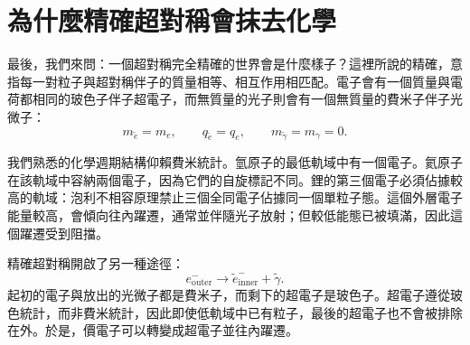 \begin{classroomqa}
\end{classroomqa}

\begin{classroomqa}
\end{classroomqa}

\begin{classroomqa}
\end{classroomqa}

\section{為什麼精確超對稱會抹去化學}

最後，我們來問：一個超對稱完全精確的世界會是什麼樣子？這裡所說的精確，意指每一對粒子與超對稱伴子的質量相等、相互作用相匹配。電子會有一個質量與電荷都相同的玻色子伴子超電子，而無質量的光子則會有一個無質量的費米子伴子光微子：
\begin{equation}
m_{\widetilde e}=m_e,
\qquad
q_{\widetilde e}=q_e,
\qquad
m_{\widetilde\gamma}=m_\gamma=0.
\end{equation}

我們熟悉的化學週期結構仰賴費米統計。氫原子的最低軌域中有一個電子。氦原子在該軌域中容納兩個電子，因為它們的自旋標記不同。鋰的第三個電子必須佔據較高的軌域：泡利不相容原理禁止三個全同電子佔據同一個單粒子態。這個外層電子能量較高，會傾向往內躍遷，通常並伴隨光子放射；但較低能態已被填滿，因此這個躍遷受到阻擋。

精確超對稱開啟了另一種途徑：
\begin{equation}
e^-_{\mathrm{outer}}
\longrightarrow
\widetilde e^-_{\mathrm{inner}}
+
\widetilde\gamma .
\end{equation}
起初的電子與放出的光微子都是費米子，而剩下的超電子是玻色子。超電子遵從玻色統計，而非費米統計，因此即使低軌域中已有粒子，最後的超電子也不會被排除在外。於是，價電子可以轉變成超電子並往內躍遷。

